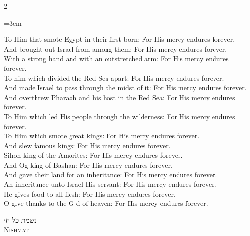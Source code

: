 \documentclass[11pt, openany]{book}
\newcommand{\sederdivider}{%
  \par\vspace{6pt}
  \begin{center}
    \textcolor{sedergold}{\pgfornament[width=1.5cm]{11}}
  \end{center}
  \par\vspace{6pt}
}
\newenvironment{bilingual}{%
  \par\vspace{4pt}%
  \begin{paracol}{2}%
}{%
  \end{paracol}%
  \par\vspace{2pt}%
}
\newenvironment{englishcol}{%
  \switchcolumn[0]%
  \begingroup
  \setstretch{1.4}%
  \emergencystretch=3em
  \tolerance=9999
  \normalsize
  \rightskip=0.12in\relax
}{%
  \endgroup
}
\newcommand{\subsedertitle}[2]{%
  \par\vspace{8pt}
  \begin{center}
    {\hebrewfontlarge\textcolor{sederblue}{\beginR #1\endR}}\\[3pt]
    {\normalsize\scshape\textcolor{sederblue}{#2}}
  \end{center}
  \par\vspace{3pt}
}
\begin{document}
\begin{bilingual}
\begin{englishcol}
To Him that smote Egypt in their first-born: For His mercy endures forever.\\[2pt]
And brought out Israel from among them: For His mercy endures forever.\\[2pt]
With a strong hand and with an outstretched arm: For His mercy endures forever.\\[2pt]
To him which divided the Red Sea apart: For His mercy endures forever.\\[2pt]
And made Israel to pass through the midst of it: For His mercy endures forever.\\[2pt]
And overthrew Pharaoh and his host in the Red Sea: For His mercy endures forever.\\[2pt]
To Him which led His people through the wilderness: For His mercy endures forever.\\[2pt]
To Him which smote great kings: For His mercy endures forever.\\[2pt]
And slew famous kings: For His mercy endures forever.\\[2pt]
Sihon king of the Amorites: For His mercy endures forever.\\[2pt]
And Og king of Bashan: For His mercy endures forever.\\[2pt]
And gave their land for an inheritance: For His mercy endures forever.\\[2pt]
An inheritance unto Israel His servant: For His mercy endures forever.\\[2pt]
He gives food to all flesh: For His mercy endures forever.\\[2pt]
O give thanks to the G-d of heaven: For His mercy endures forever.
\end{englishcol}
\end{bilingual}
\sederdivider

\subsedertitle{נשמת כל חי}{Nishmat}
\end{document}
